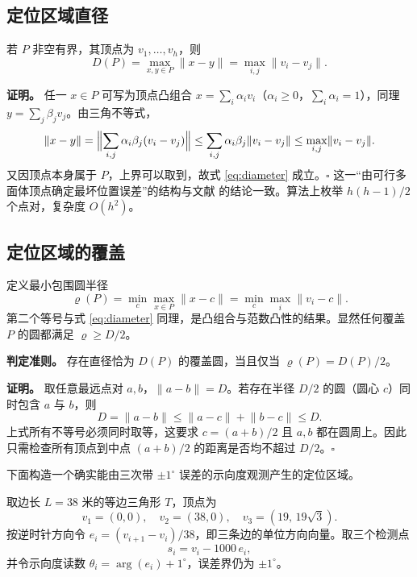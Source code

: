 \documentclass[UTF8,a4paper,zihao=-4,fontset=none]{ctexart}
\begin{document}
\subsection{定位区域直径}

若 $P$ 非空有界，其顶点为 $v_1,\dots,v_h$，则
\begin{equation}
  D(P)=\max_{x,y\in P}\lVert x-y\rVert=\max_{i,j}\lVert v_i-v_j\rVert .
  \label{eq:diameter}
\end{equation}

\textbf{证明。} 任一 $x\in P$ 可写为顶点凸组合 $x=\sum_i\alpha_iv_i$（$\alpha_i\ge0$，$\sum_i\alpha_i=1$），同理 $y=\sum_j\beta_jv_j$。由三角不等式，
\begin{equation}
  \lVert x-y\rVert
  =\Bigl\lVert\sum_{i,j}\alpha_i\beta_j(v_i-v_j)\Bigr\rVert
  \le\sum_{i,j}\alpha_i\beta_j\lVert v_i-v_j\rVert
  \le\max_{i,j}\lVert v_i-v_j\rVert .
\end{equation}
又因顶点本身属于 $P$，上界可以取到，故式 \eqref{eq:diameter} 成立。$\square$ 
这一“由可行多面体顶点确定最坏位置误差”的结构与文献 \cite{Gholami2015} 的结论一致。算法上枚举 $h(h-1)/2$ 个点对，复杂度 $O(h^2)$。

\subsection{定位区域的覆盖}

定义最小包围圆半径
\begin{equation}
  \varrho(P)=\min_c\max_{x\in P}\lVert x-c\rVert
  =\min_c\max_i\lVert v_i-c\rVert .
  \label{eq:mincircle}
\end{equation}
第二个等号与式 \eqref{eq:diameter} 同理，是凸组合与范数凸性的结果。显然任何覆盖 $P$ 的圆都满足 $\varrho\ge D/2$。

\textbf{判定准则。} 存在直径恰为 $D(P)$ 的覆盖圆，当且仅当 $\varrho(P)=D(P)/2$。

\textbf{证明。} 取任意最远点对 $a,b$，$\lVert a-b\rVert=D$。若存在半径 $D/2$ 的圆（圆心 $c$）同时包含 $a$ 与 $b$，则
\begin{equation}
  D=\lVert a-b\rVert\le\lVert a-c\rVert+\lVert b-c\rVert\le D .
\end{equation}
上式所有不等号必须同时取等，这要求 $c=(a+b)/2$ 且 $a,b$ 都在圆周上。因此只需检查所有顶点到中点 $(a+b)/2$ 的距离是否均不超过 $D/2$。$\square$

下面构造一个确实能由三次带 $\pm1^\circ$ 误差的示向度观测产生的定位区域。

取边长 $L=38$ 米的等边三角形 $T$，顶点为
\begin{equation}
  v_1=(0,0),\quad v_2=(38,0),\quad v_3=(19,\,19\sqrt3).
  \label{eq:triangle}
\end{equation}
按逆时针方向令 $e_i=(v_{i+1}-v_i)/38$，即三条边的单位方向向量。取三个检测点
\begin{equation}
  s_i=v_i-1000\,e_i,
\end{equation}
并令示向度读数 $\theta_i=\arg(e_i)+1^\circ$，误差界仍为 $\pm1^\circ$。
\end{document}
